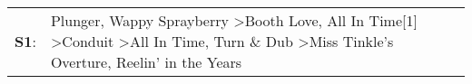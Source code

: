 \begin{supertabular}{p{0.03\textwidth}p{0.92\textwidth}}
 \textbf{S1}:  &  Plunger\textsuperscript{}, \enspace Wappy Sprayberry\textsuperscript{} \textgreater \enspace Booth Love\textsuperscript{}, \enspace All In Time[1]\textsuperscript{} \textgreater \enspace Conduit\textsuperscript{} \textgreater \enspace All In Time\textsuperscript{}, \enspace Turn \& Dub\textsuperscript{} \textgreater \enspace Miss Tinkle's Overture\textsuperscript{}, \enspace Reelin' in the Years\textsuperscript{}  \enspace  \\
\end{supertabular}
